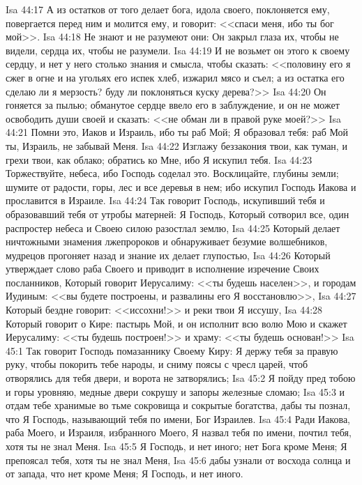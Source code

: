 \vs Isa 44:17 А из остатков от того делает бога, идола своего, поклоняется ему, повергается перед ним и молится ему, и говорит: <<спаси меня, ибо ты бог мой>>.
\vs Isa 44:18 Не знают и не разумеют они: Он закрыл глаза их, чтобы не видели,  сердца их, чтобы не разумели.
\vs Isa 44:19 И не возьмет он этого к своему сердцу, и нет у него столько знания и смысла, чтобы сказать: <<половину его я сжег в огне и на угольях его испек хлеб, изжарил мясо и съел; а из остатка его сделаю ли я мерзость? буду ли поклоняться куску дерева?>>
\vs Isa 44:20 Он гоняется за пылью; обманутое сердце ввело его в заблуждение, и он не может освободить души своей и сказать: <<не обман ли в правой руке моей?>>
\vs Isa 44:21 Помни это, Иаков и Израиль, ибо ты раб Мой; Я образовал тебя: раб Мой ты, Израиль, не забывай Меня.
\vs Isa 44:22 Изглажу беззакония твои, как туман, и грехи твои, как облако; обратись ко Мне, ибо Я искупил тебя.
\vs Isa 44:23 Торжествуйте, небеса, ибо Господь соделал это. Восклицайте, глубины земли; шумите от радости, горы, лес и все деревья в нем; ибо искупил Господь Иакова и прославится в Израиле.
\rsbpar\vs Isa 44:24 Так говорит Господь, искупивший тебя и образовавший тебя от утробы матерней: Я Господь, Который сотворил все, один распростер небеса и Своею силою разостлал землю,
\vs Isa 44:25 Который делает ничтожными знамения лжепророков и обнаруживает безумие волшебников, мудрецов прогоняет назад и знание их делает глупостью,
\vs Isa 44:26 Который утверждает слово раба Своего и приводит в исполнение изречение Своих посланников, Который говорит Иерусалиму: <<ты будешь населен>>, и городам Иудиным: <<вы будете построены, и развалины его Я восстановлю>>,
\vs Isa 44:27 Который бездне говорит: <<иссохни!>> и реки твои Я иссушу,
\vs Isa 44:28 Который говорит о Кире: пастырь Мой, и он исполнит всю волю Мою и скажет Иерусалиму: <<ты будешь построен!>> и храму: <<ты будешь основан!>>
\vs Isa 45:1 Так говорит Господь помазаннику Своему Киру: Я держу тебя за правую руку, чтобы покорить тебе народы, и сниму поясы с чресл царей, чтоб отворялись для тебя двери, и ворота не затворялись;
\vs Isa 45:2 Я пойду пред тобою и горы уровняю, медные двери сокрушу и запоры железные сломаю;
\vs Isa 45:3 и отдам тебе хранимые во тьме сокровища и сокрытые богатства, дабы ты познал, что Я Господь, называющий тебя по имени, Бог Израилев.
\vs Isa 45:4 Ради Иакова, раба Моего, и Израиля, избранного Моего, Я назвал тебя по имени, почтил тебя, хотя ты не знал Меня.
\vs Isa 45:5 Я Господь, и нет иного; нет Бога кроме Меня; Я препоясал тебя, хотя ты не знал Меня,
\vs Isa 45:6 дабы узнали от восхода солнца и от запада, что нет кроме Меня; Я Господь, и нет иного.
